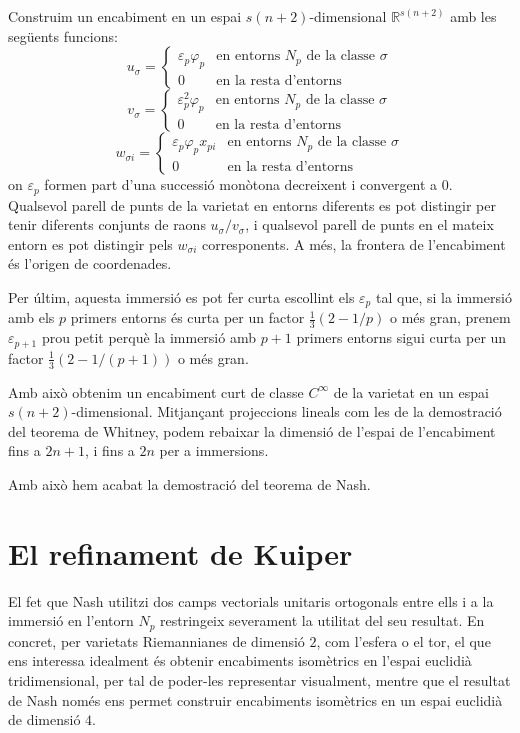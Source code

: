 Construim un encabiment en un espai $s(n+2)$-dimensional $\mathbb R^{s(n+2)}$ amb les següents funcions:
\begin{equation}
    u_\sigma = 
    \begin{cases}
        \varepsilon_p\varphi_p & \text{en entorns $N_p$ de la classe $\sigma$} \\
        0 & \text{en la resta d'entorns}
    \end{cases}
\end{equation}
\begin{equation}
    v_\sigma = 
    \begin{cases}
        \varepsilon_p^2\varphi_p & \text{en entorns $N_p$ de la classe $\sigma$} \\
        0 & \text{en la resta d'entorns}
    \end{cases}
\end{equation}
\begin{equation}
    w_{\sigma i} = 
    \begin{cases}
        \varepsilon_p\varphi_p x_{p i} & \text{en entorns $N_p$ de la classe $\sigma$} \\
        0 & \text{en la resta d'entorns}
    \end{cases}
\end{equation}
on $\varepsilon_p$ formen part d'una successió monòtona decreixent i convergent a $0$. Qualsevol parell de punts de la varietat en entorns diferents es pot distingir per tenir diferents conjunts de raons $u_\sigma/v_\sigma$, i qualsevol parell de punts en el mateix entorn es pot distingir pels $w_{\sigma i}$ corresponents. A més, la frontera de l'encabiment és l'origen de coordenades.

Per últim, aquesta immersió es pot fer curta escollint els $\varepsilon_p$ tal que, si la immersió amb els $p$ primers entorns és curta per un factor $\frac13(2-1/p)$ o més gran, prenem $\varepsilon_{p+1}$ prou petit perquè la immersió amb $p+1$ primers entorns sigui curta per un factor $\frac13(2-1/(p+1))$ o més gran. 

Amb això obtenim un encabiment curt de classe $C^\infty$ de la varietat en un espai $s(n+2)$-dimensional. Mitjançant projeccions lineals com les de la demostració del teorema de Whitney, podem rebaixar la dimensió de l'espai de l'encabiment fins a $2n+1$, i fins a $2n$ per a immersions.

Amb això hem acabat la demostració del teorema de Nash.

\section{El refinament de Kuiper}
El fet que Nash utilitzi dos camps vectorials unitaris ortogonals entre ells i a la immersió en l'entorn $N_p$ restringeix severament la utilitat del seu resultat. En concret, per varietats Riemannianes de dimensió $2$, com l'esfera o el tor, el que ens interessa idealment és obtenir encabiments isomètrics en l'espai euclidià tridimensional, per tal de poder-les representar visualment, mentre que el resultat de Nash només ens permet construir encabiments isomètrics en un espai euclidià de dimensió $4$. 

